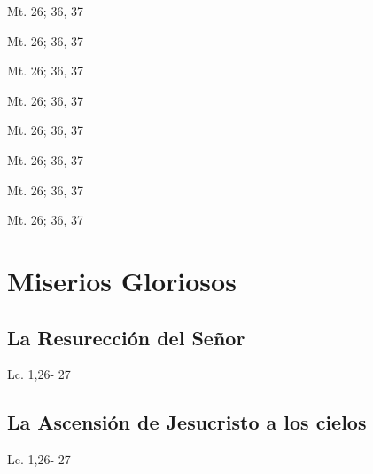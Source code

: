 \documentclass[a4paper,11pt,sans]{article}
\begin{document}
      \begin{center}
        Mt. 26; 36, 37     
      \end{center}

      \begin{center}
        Mt. 26; 36, 37     
      \end{center}

      \begin{center}
        Mt. 26; 36, 37     
      \end{center}

      \begin{center}
        Mt. 26; 36, 37     
      \end{center}

      \begin{center}
        Mt. 26; 36, 37     
      \end{center}

      \begin{center}
        Mt. 26; 36, 37     
      \end{center}

      \begin{center}
        Mt. 26; 36, 37     
      \end{center}

      \begin{center}
        Mt. 26; 36, 37     
      \end{center}
 
    \newpage
         
  \section*{\hfil Miserios Gloriosos \hfil}
    \subsection*{\hfil La Resurección del Señor \hfil}
      \begin{multicols}{2}

      \columnbreak
                           
      \end{multicols}
      \begin{center}
        Lc. 1,26- 27           
      \end{center}
    \subsection*{\hfil La Ascensión de Jesucristo a los cielos \hfil}
      \begin{multicols}{2}

      \columnbreak
                           
      \end{multicols}         
      \begin{center}
        Lc. 1,26- 27           
      \end{center}
\end{document}

